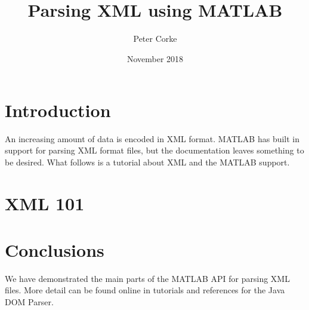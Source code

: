 \documentclass[9pt,fleqn,a4paper]{article}
\title{Parsing XML using MATLAB\textsuperscript{\textregistered}}
\author{Peter Corke}
\date{November 2018}                                           %
\begin{document}
\maketitle

\section{Introduction}
An increasing amount of data is encoded in XML format.  MATLAB has built in support for parsing XML format files, but the documentation
leaves something to be desired.  What follows is a tutorial about XML and the MATLAB support.


\section{XML 101}




\section{Conclusions}
We have demonstrated the main parts of the MATLAB API for parsing XML files.  More detail can be found online
in tutorials and references for the Java DOM Parser.



\end{document}
